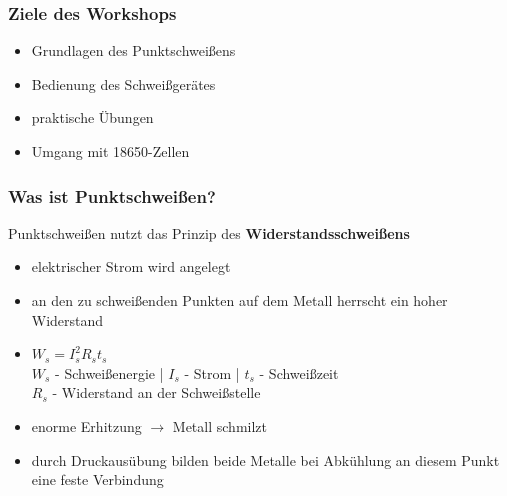 \documentclass[handout, usenames,dvipsnames, nosymbols,aspectratio=169]{beamer}
\begin{document}
	\addtocounter{framenumber}{-1}	%
	\titlepage
	
	\begin{frame}
		\frametitle{Ziele des Workshops}
		\begin{itemize}[<+->]
			\item Grundlagen des Punktschweißens
			\item Bedienung des Schweißgerätes
			\item praktische Übungen
			\item Umgang mit 18650-Zellen
		\end{itemize}
	\end{frame}
	
	\begin{frame}
		\frametitle{Was ist Punktschweißen?}
		Punktschweißen nutzt das Prinzip des \textbf{Widerstandsschweißens}\\[0.5em]
		\begin{minipage}{0.65\textwidth}	
			\begin{itemize}[<+->]
				\item elektrischer Strom wird angelegt
				\item an den zu schweißenden Punkten auf dem Metall herrscht ein hoher Widerstand
				\item  ${W_{s} = I^{2}_{s}R_{s}t_{s}}$\\
				\color{gray}
				$W_{s}$ - Schweißenergie | $I_{s}$ - Strom | $t_{s}$ - Schweißzeit\\
				$R_{s}$ - Widerstand an der Schweißstelle\\
				\normalcolor
				\item enorme Erhitzung $\rightarrow$ Metall schmilzt
				\item durch Druckausübung bilden beide Metalle bei Abkühlung an diesem Punkt eine feste Verbindung
			\end{itemize}
		\end{minipage}
		\begin{minipage}{0.3\textwidth}

\end{minipage}
\end{frame}
\end{document}
